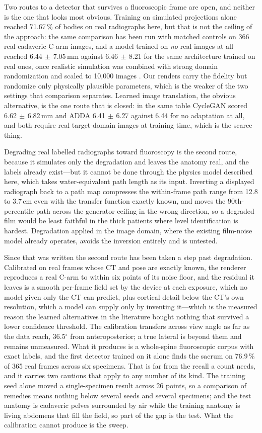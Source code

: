 \documentclass[11pt,letterpaper]{article}
\begin{document}
Two routes to a detector that survives a fluoroscopic frame are open, and neither is the one that looks
most obvious. Training on simulated projections alone reached 71.67\,\% of bodies on real radiographs
here, but that is not the ceiling of the approach: the same comparison has been run with matched
controls on 366 real cadaveric C-arm images, and a model trained on \emph{no} real images at all
reached 6.44$\,\pm\,$7.05\,mm against 6.46$\,\pm\,$8.21 for the same architecture trained on real
ones, once realistic simulation was combined with strong domain randomization and scaled to
10{,}000 images \citep{synthex2023}. Our renders carry the fidelity but randomize only physically
plausible parameters, which is the weaker of the two settings that comparison separates. Learned image
translation, the obvious alternative, is the one route that is closed: in the same table CycleGAN scored
6.62$\,\pm\,$6.82\,mm and ADDA 6.41$\,\pm\,$6.27 against 6.44 for no adaptation at all, and both
require real target-domain images at training time, which is the scarce thing.

Degrading real labelled radiographs toward fluoroscopy is the second route, because it
simulates only the degradation and leaves the anatomy real, and the labels already exist---but it cannot
be done through the physics model described here, which takes water-equivalent path length as its input.
Inverting a displayed radiograph back to a path map compresses the within-frame path range from 12.8 to
3.7\,cm even with the transfer function exactly known, and moves the 90th-percentile path across the
generator ceiling in the wrong direction, so a degraded film would be least faithful in the thick
patients where level identification is hardest. Degradation applied in the image domain, where the
existing film-noise model already operates, avoids the inversion entirely and is untested.

Since that was written the second route has been taken a step past degradation. Calibrated on real
frames whose CT and pose are exactly known, the renderer reproduces a real C-arm to within six points
of its noise floor, and the residual it leaves is a smooth per-frame field set by the device at each
exposure, which no model given only the CT can predict, plus cortical detail below the CT's own
resolution, which a model can supply only by inventing it---which is the measured reason the learned
alternatives in the literature bought nothing that survived a lower confidence threshold. The calibration transfers across view angle as far as the data reach, 36.5$^\circ$
from anteroposterior; a true lateral is beyond them and remains unmeasured. What it produces is a
whole-spine fluoroscopic corpus with exact labels, and the first detector trained on it alone finds
the sacrum on 76.9\,\% of 365 real frames across six specimens. That is far from the recall a count
needs, and it carries two cautions that apply to any number of its kind. The training seed alone moved
a single-specimen result across 26 points, so a comparison of remedies means nothing below several seeds
and several specimens; and the test anatomy is cadaveric pelves surrounded by air while the training
anatomy is living abdomens that fill the field, so part of the gap is the test. What the calibration
cannot produce is the sweep.
\end{document}
